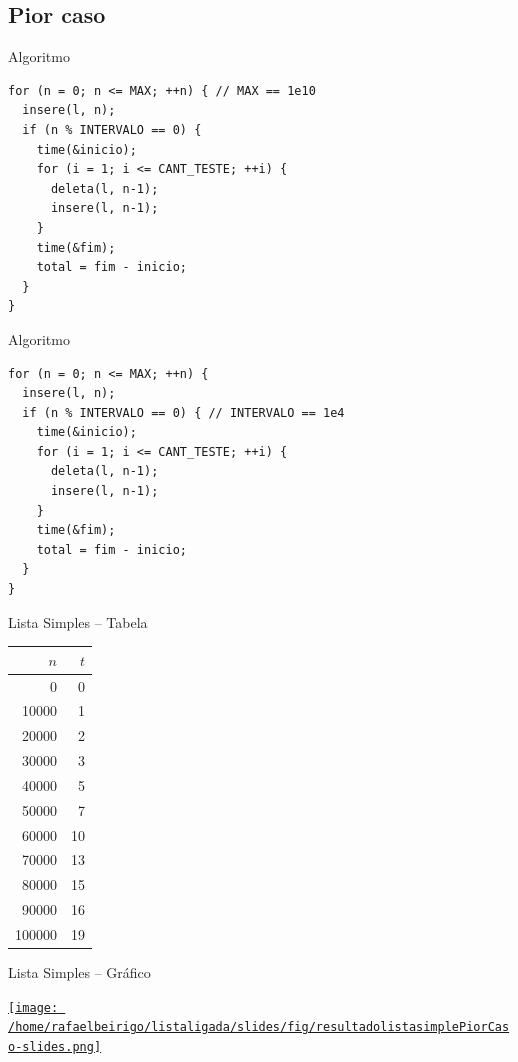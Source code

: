\documentclass[bigger]{beamer}
\begin{document}
\subsection{Pior caso}
\label{sec-3-2}
\begin{frame}[fragile,label=sec-3-2-1]{Algoritmo}
 \begin{verbatim}
for (n = 0; n <= MAX; ++n) { // MAX == 1e10
  insere(l, n);
  if (n % INTERVALO == 0) {
    time(&inicio);
    for (i = 1; i <= CANT_TESTE; ++i) {
      deleta(l, n-1);
      insere(l, n-1);
    }
    time(&fim);
    total = fim - inicio;
  }
}
\end{verbatim}
\end{frame}
\begin{frame}[fragile,label=sec-3-2-2]{Algoritmo}
 \begin{verbatim}
for (n = 0; n <= MAX; ++n) {
  insere(l, n);
  if (n % INTERVALO == 0) { // INTERVALO == 1e4
    time(&inicio);
    for (i = 1; i <= CANT_TESTE; ++i) {
      deleta(l, n-1);
      insere(l, n-1);
    }
    time(&fim);
    total = fim - inicio;
  }
}
\end{verbatim}
\end{frame}
\begin{frame}[label=sec-3-2-3]{Lista Simples -- Tabela}
\begin{center}
\begin{tabular}{rr}
$n$ & $t$\\
\hline
0 & 0\\
10000 & 1\\
20000 & 2\\
30000 & 3\\
40000 & 5\\
50000 & 7\\
60000 & 10\\
70000 & 13\\
80000 & 15\\
90000 & 16\\
100000 & 19\\
\end{tabular}
\end{center}
\end{frame}
\begin{frame}[label=sec-3-2-4]{Lista Simples -- Gráfico}
\begin{center}
\href{fig/resultadolistasimplePiorCaso-slides.png}{\texttt{[image: /home/rafaelbeirigo/listaligada/slides/fig/resultadolistasimplePiorCaso-slides.png]}}
\end{center}
\end{frame}
\end{document}
